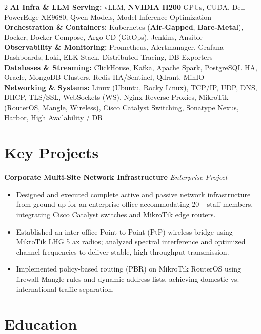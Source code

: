 \documentclass[10pt,a4paper]{article}
\begin{document}
\begin{paracol}{2}
\textbf{AI Infra \& LLM Serving:} vLLM, \textbf{NVIDIA H200} GPUs, CUDA, Dell PowerEdge XE9680, Qwen Models, Model Inference Optimization\\[3pt]
\textbf{Orchestration \& Containers:} Kubernetes (\textbf{Air-Gapped}, \textbf{Bare-Metal}), Docker, Docker Compose, Argo CD (GitOps), Jenkins, Ansible\\[3pt]
\textbf{Observability \& Monitoring:} Prometheus, Alertmanager, Grafana Dashboards, Loki, ELK Stack, Distributed Tracing, DB Exporters\\[3pt]
\textbf{Databases \& Streaming:} ClickHouse, Kafka, Apache Spark, PostgreSQL HA, Oracle, MongoDB Clusters, Redis HA/Sentinel, Qdrant, MinIO\\[3pt]
\textbf{Networking \& Systems:} Linux (Ubuntu, Rocky Linux), TCP/IP, UDP, DNS, DHCP, TLS/SSL, WebSockets (WS), Nginx Reverse Proxies, MikroTik (RouterOS, Mangle, Wireless), Cisco Catalyst Switching, Sonatype Nexus, Harbor, High Availability / DR

\vspace{8pt}

\section{Key Projects}

\textbf{Corporate Multi-Site Network Infrastructure} \hfill \textit{Enterprise Project}
\begin{itemize}
    \item Designed and executed complete active and passive network infrastructure from ground up for an enterprise office accommodating 20+ staff members, integrating Cisco Catalyst switches and MikroTik edge routers.
    \item Established an inter-office Point-to-Point (PtP) wireless bridge using MikroTik LHG 5 ax radios; analyzed spectral interference and optimized channel frequencies to deliver stable, high-throughput transmission.
    \item Implemented policy-based routing (PBR) on MikroTik RouterOS using firewall Mangle rules and dynamic address lists, achieving domestic vs. international traffic separation.
\end{itemize}

\switchcolumn

\section{Education}


\end{paracol}
\end{document}

